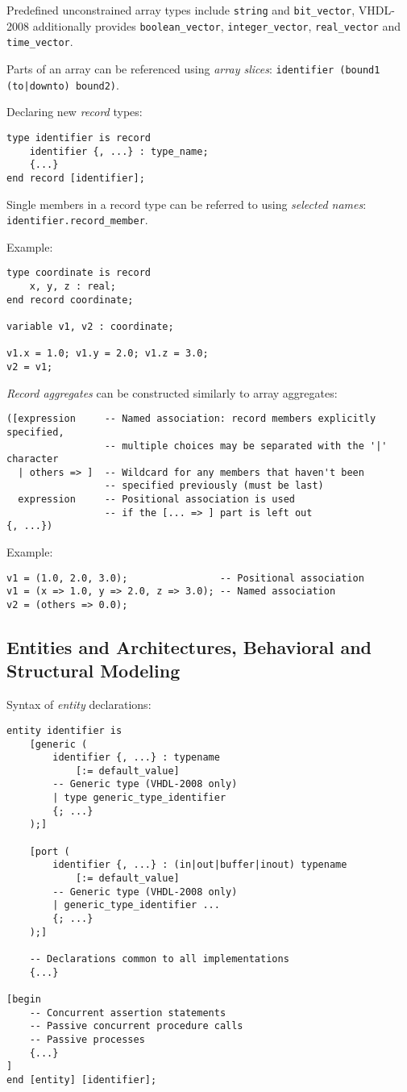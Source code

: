 \documentclass[fontsize=11pt,a4paper]{scrartcl}
\begin{document}
Predefined unconstrained array types include \lstinline!string! and \lstinline!bit_vector!, VHDL-2008 additionally provides \lstinline!boolean_vector!, \lstinline!integer_vector!, \lstinline!real_vector! and \lstinline!time_vector!.

Parts of an array can be referenced using \emph{array slices}: \lstinline!identifier (bound1 (to|downto) bound2)!.

Declaring new \emph{record} types:
\begin{lstlisting}
type identifier is record
	identifier {, ...} : type_name;
	{...}
end record [identifier];
\end{lstlisting}

Single members in a record type can be referred to using \emph{selected names}: \lstinline!identifier.record_member!.

Example:
\begin{lstlisting}
type coordinate is record
	x, y, z : real;
end record coordinate;

variable v1, v2 : coordinate;

v1.x = 1.0; v1.y = 2.0; v1.z = 3.0;
v2 = v1;
\end{lstlisting}

\emph{Record aggregates} can be constructed similarly to array aggregates:
\begin{lstlisting}
([expression     -- Named association: record members explicitly specified,
                 -- multiple choices may be separated with the '|' character
  | others => ]  -- Wildcard for any members that haven't been
                 -- specified previously (must be last)
  expression     -- Positional association is used
                 -- if the [... => ] part is left out
{, ...})
\end{lstlisting}

Example:
\begin{lstlisting}
v1 = (1.0, 2.0, 3.0);                -- Positional association
v1 = (x => 1.0, y => 2.0, z => 3.0); -- Named association
v2 = (others => 0.0);
\end{lstlisting}
%
%
%
%
\newpage
\subsection{Entities and Architectures, Behavioral and Structural Modeling}
Syntax of \emph{entity} declarations:
\begin{lstlisting}
entity identifier is
	[generic (
		identifier {, ...} : typename
			[:= default_value]
		-- Generic type (VHDL-2008 only)
		| type generic_type_identifier
		{; ...}
	);]

	[port (
		identifier {, ...} : (in|out|buffer|inout) typename
			[:= default_value]
		-- Generic type (VHDL-2008 only)
		| generic_type_identifier ...
		{; ...}
	);]

	-- Declarations common to all implementations
	{...}

[begin
	-- Concurrent assertion statements
	-- Passive concurrent procedure calls
	-- Passive processes
	{...}
]
end [entity] [identifier];
\end{lstlisting}
\end{document}
